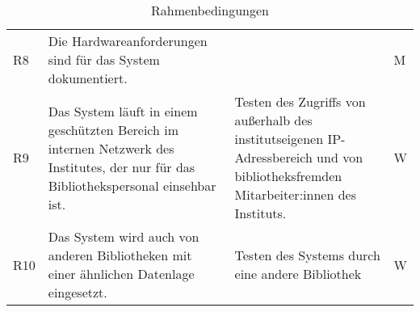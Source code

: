 \begin{table}[h]
\begin{adjustbox}{max width=\textwidth}
\begin{tabular}{lp{7.5cm}p{7.5cm}l}
        R8                                &Die Hardwareanforderungen sind für das System dokumentiert. & & M\\
        R9                               &Das System läuft in einem geschützten Bereich im internen Netzwerk des Institutes, der nur für das Bibliothekspersonal einsehbar ist. & Testen des Zugriffs von außerhalb des institutseigenen IP-Adressbereich und von bibliotheksfremden Mitarbeiter:innen des Instituts.& W\\
        R10                               &Das System wird auch von anderen Bibliotheken mit einer ähnlichen Datenlage eingesetzt. & Testen des Systems durch eine andere Bibliothek & W\\
       \bottomrule
    \end{tabular}
    \end{adjustbox}
    \caption{%
        Rahmenbedingungen
    }
    \label{tab:Rahmenbedingungen}
    \end{table}
\endgroup







